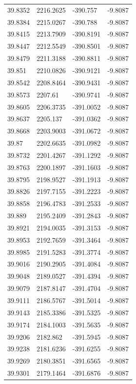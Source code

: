 \begin{table}[H]
\begin{tabular}{llll}
39.8352 & 2216.2625 & -390.757 & -9.8087 \\
39.8384 & 2215.0267 & -390.788 & -9.8087 \\
39.8415 & 2213.7909 & -390.8191 & -9.8087 \\
39.8447 & 2212.5549 & -390.8501 & -9.8087 \\
39.8479 & 2211.3188 & -390.8811 & -9.8087 \\
39.851 & 2210.0826 & -390.9121 & -9.8087 \\
39.8542 & 2208.8464 & -390.9431 & -9.8087 \\
39.8573 & 2207.61 & -390.9741 & -9.8087 \\
39.8605 & 2206.3735 & -391.0052 & -9.8087 \\
39.8637 & 2205.137 & -391.0362 & -9.8087 \\
39.8668 & 2203.9003 & -391.0672 & -9.8087 \\
39.87 & 2202.6635 & -391.0982 & -9.8087 \\
39.8732 & 2201.4267 & -391.1292 & -9.8087 \\
39.8763 & 2200.1897 & -391.1603 & -9.8087 \\
39.8795 & 2198.9527 & -391.1913 & -9.8087 \\
39.8826 & 2197.7155 & -391.2223 & -9.8087 \\
39.8858 & 2196.4783 & -391.2533 & -9.8087 \\
39.889 & 2195.2409 & -391.2843 & -9.8087 \\
39.8921 & 2194.0035 & -391.3153 & -9.8087 \\
39.8953 & 2192.7659 & -391.3464 & -9.8087 \\
39.8985 & 2191.5283 & -391.3774 & -9.8087 \\
39.9016 & 2190.2905 & -391.4084 & -9.8087 \\
39.9048 & 2189.0527 & -391.4394 & -9.8087 \\
39.9079 & 2187.8147 & -391.4704 & -9.8087 \\
39.9111 & 2186.5767 & -391.5014 & -9.8087 \\
39.9143 & 2185.3386 & -391.5325 & -9.8087 \\
39.9174 & 2184.1003 & -391.5635 & -9.8087 \\
39.9206 & 2182.862 & -391.5945 & -9.8087 \\
39.9238 & 2181.6236 & -391.6255 & -9.8087 \\
39.9269 & 2180.3851 & -391.6565 & -9.8087 \\
39.9301 & 2179.1464 & -391.6876 & -9.8087 \\

\end{tabular}
\end{table}
